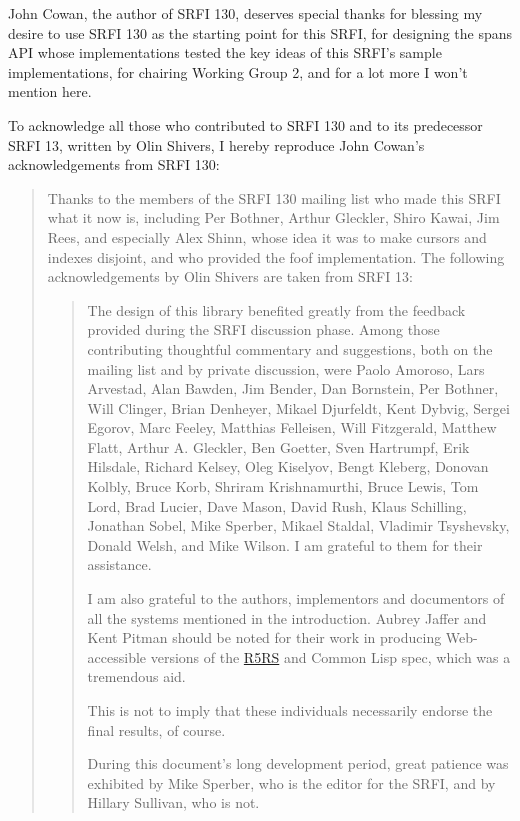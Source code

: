 John Cowan, the author of SRFI 130, deserves special thanks for blessing
my desire to use SRFI 130 as the starting point for this SRFI, for
designing the spans API whose implementations tested the key ideas of
this SRFI's sample implementations, for chairing Working Group 2, and
for a lot more I won't mention here.

To acknowledge all those who contributed to SRFI 130 and to its
predecessor SRFI 13, written by Olin Shivers, I hereby reproduce John
Cowan's acknowledgements from SRFI 130:

\begin{quote}
Thanks to the members of the SRFI 130 mailing list who made this SRFI
what it now is, including Per Bothner, Arthur Gleckler, Shiro Kawai, Jim
Rees, and especially Alex Shinn, whose idea it was to make cursors and
indexes disjoint, and who provided the foof implementation. The
following acknowledgements by Olin Shivers are taken from SRFI 13:

\begin{quote}
The design of this library benefited greatly from the feedback provided
during the SRFI discussion phase. Among those contributing thoughtful
commentary and suggestions, both on the mailing list and by private
discussion, were Paolo Amoroso, Lars Arvestad, Alan Bawden, Jim Bender,
Dan Bornstein, Per Bothner, Will Clinger, Brian Denheyer, Mikael
Djurfeldt, Kent Dybvig, Sergei Egorov, Marc Feeley, Matthias Felleisen,
Will Fitzgerald, Matthew Flatt, Arthur A. Gleckler, Ben Goetter, Sven
Hartrumpf, Erik Hilsdale, Richard Kelsey, Oleg Kiselyov, Bengt Kleberg,
Donovan Kolbly, Bruce Korb, Shriram Krishnamurthi, Bruce Lewis, Tom
Lord, Brad Lucier, Dave Mason, David Rush, Klaus Schilling, Jonathan
Sobel, Mike Sperber, Mikael Staldal, Vladimir Tsyshevsky, Donald Welsh,
and Mike Wilson. I am grateful to them for their assistance.

I am also grateful to the authors, implementors and documentors of all
the systems mentioned in the introduction. Aubrey Jaffer and Kent Pitman
should be noted for their work in producing Web-accessible versions of
the \protect\hyperlink{R5RS}{R5RS} and Common Lisp spec, which was a
tremendous aid.

This is not to imply that these individuals necessarily endorse the
final results, of course.

During this document's long development period, great patience was
exhibited by Mike Sperber, who is the editor for the SRFI, and by
Hillary Sullivan, who is not.
\end{quote}
\end{quote}

